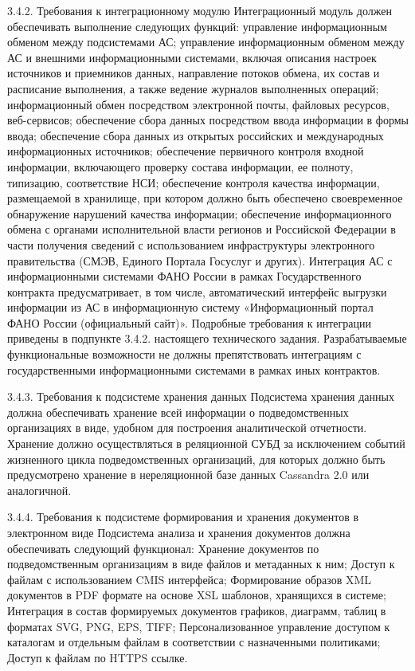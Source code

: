 3.4.2. Требования к интеграционному модулю
Интеграционный модуль должен обеспечивать выполнение следующих функций:
управление информационным обменом между подсистемами АС;
управление информационным обменом между АС и внешними информационными системами, включая описания настроек источников и приемников данных, направление потоков обмена, их состав и расписание выполнения, а также ведение журналов выполненных операций;
информационный обмен посредством электронной почты, файловых ресурсов, веб-сервисов;
обеспечение сбора данных посредством ввода информации в формы ввода;
обеспечение сбора данных из открытых российских и международных информационных источников;
обеспечение первичного контроля входной информации, включающего проверку состава информации, ее полноту, типизацию, соответствие НСИ;
обеспечение контроля качества информации, размещаемой в хранилище, при котором должно быть обеспечено своевременное обнаружение нарушений качества информации;
обеспечение информационного обмена  с органами исполнительной власти регионов и Российской Федерации в части получения сведений с использованием  инфраструктуры электронного правительства (СМЭВ, Единого Портала Госуслуг и других).
Интеграция АС с информационными системами ФАНО России в рамках Государственного контракта предусматривает, в том числе, автоматический интерфейс выгрузки информации из АС в информационную систему «Информационный портал ФАНО России (официальный сайт)». Подробные требования к интеграции приведены в подпункте 3.4.2. настоящего технического задания.
Разрабатываемые функциональные возможности не должны препятствовать интеграциям с государственными информационными системами в рамках иных контрактов.

3.4.3. Требования к подсистеме хранения данных
Подсистема хранения данных должна обеспечивать хранение всей информации о подведомственных организациях в виде, удобном для построения аналитической отчетности. 
Хранение должно осуществляться в реляционной СУБД за исключением событий жизненного цикла подведомственных организаций, для которых должно быть предусмотрено хранение в нереляционной базе данных Cassandra 2.0 или аналогичной.

3.4.4. Требования к подсистеме формирования и хранения  документов в электронном виде
Подсистема анализа и хранения документов должна обеспечивать следующий функционал:
Хранение документов по подведомственным организациям в виде файлов и метаданных к ним;
Доступ к файлам с использованием CMIS интерфейса;
Формирование образов XML документов в PDF формате на основе XSL шаблонов, хранящихся в системе;
Интеграция в состав формируемых документов графиков, диаграмм, таблиц в форматах SVG, PNG, EPS, TIFF;
Персонализованное управление доступом к каталогам и отдельным файлам в соответствии с назначенными политиками;
Доступ к файлам по HTTPS ссылке. 

